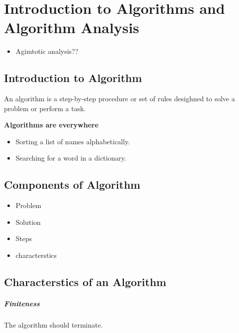 \chapter{Introduction to Algorithms and Algorithm Analysis}
\label{chap:intro-algo-nanalysis}

\begin{note}[Objectives]
  \begin{itemize}
    \item Agimtotic analysis??
  \end{itemize}
\end{note}

\section{Introduction to Algorithm}
\label{sec:intro-algo}

\begin{definition}[Algorithm]
  An algorithm is a step-by-step procedure or set of rules desighned to solve a
  problem or perform a task.
\end{definition}

\textbf{Algorithms are everywhere}
\begin{itemize}
  \item Sorting a list of names alphabetically.
  \item Searching for a word in a dictionary.
\end{itemize}

\section{Components of Algorithm}
\label{ssec:components-of-algo}

\begin{itemize}
  \item Problem
  \item Solution
  \item Steps
  \item characterstics
\end{itemize}

\section{Characterstics of an Algorithm}
\label{ssec:char-algo}
\paragraph{Finiteness} The algorithm should terminate.
